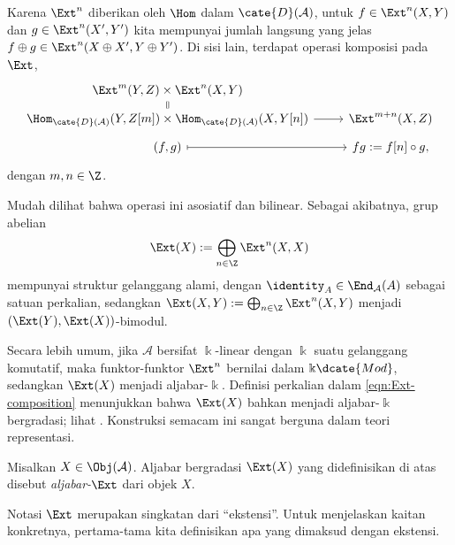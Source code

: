 Karena $\Ext^n$ diberikan oleh $\Hom$ dalam $\cate{D}(\mathcal{A})$, untuk
$f \in \Ext^n(X, Y)$ dan $g \in \Ext^n(X', Y')$ kita mempunyai jumlah
langsung yang jelas
$f \oplus g \in \Ext^n(X \oplus X', Y \oplus Y')$. Di sisi lain, terdapat
operasi komposisi pada $\Ext$,
\begin{equation}\label{eqn:Ext-composition}\begin{tikzcd}[row sep=tiny]
	\Ext^m(Y, Z) \times \Ext^n(X, Y) \arrow[equal, d] & \\
	\Hom_{\cate{D}(\mathcal{A})}(Y, Z[m]) \times \Hom_{\cate{D}(\mathcal{A})}(X, Y[n]) \arrow[r] & \Ext^{m+n}(X, Z) \\
	(f, g) \arrow[r, mapsto] & fg := f[n] \circ g ,
\end{tikzcd}\end{equation}
dengan $m, n \in \Z$.

Mudah dilihat bahwa operasi ini asosiatif dan bilinear. Sebagai akibatnya,
grup abelian
\[ \Ext(X) := \bigoplus_{n \in \Z} \Ext^n(X, X) \]
mempunyai struktur gelanggang alami, dengan
$\identity_A \in \End_{\mathcal{A}}(A)$ sebagai satuan perkalian,
sedangkan
$\Ext(X, Y) := \bigoplus_{n \in \Z} \Ext^n(X, Y)$ menjadi
$(\Ext(Y), \Ext(X))$-bimodul.

	Secara lebih umum, jika $\mathcal{A}$ bersifat $\Bbbk$-linear dengan $\Bbbk$
	suatu gelanggang komutatif, maka funktor-funktor $\Ext^n$ bernilai dalam
	$\Bbbk\dcate{Mod}$, sedangkan $\Ext(X)$ menjadi aljabar-$\Bbbk$. Definisi
perkalian dalam \eqref{eqn:Ext-composition} menunjukkan bahwa $\Ext(X)$ bahkan
menjadi aljabar-$\Bbbk$ bergradasi; lihat \cite[Definisi 7.4.1]{Li1}.
Konstruksi semacam ini sangat berguna dalam teori representasi.

\begin{definisi}\label{def:Ext-algebra}
	Misalkan $X \in \Obj(\mathcal{A})$. Aljabar bergradasi $\Ext(X)$ yang
	didefinisikan di atas disebut \emph{aljabar-$\Ext$} dari objek $X$.
\end{definisi}

Notasi $\Ext$ merupakan singkatan dari ``ekstensi''. Untuk menjelaskan kaitan
konkretnya, pertama-tama kita definisikan apa yang dimaksud dengan ekstensi.

